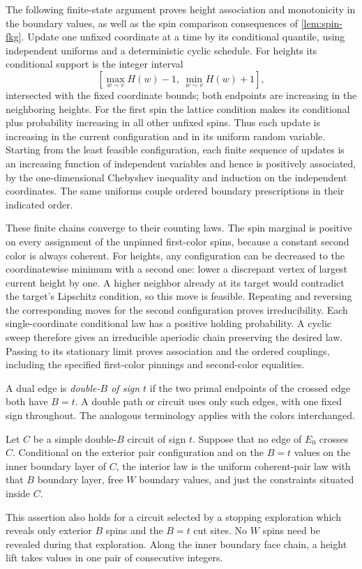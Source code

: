 The following finite-state argument proves height association and
monotonicity in the boundary values, as well as the spin comparison
consequences of \cref{lem:spin-fkg}.  Update one unfixed coordinate at a time by its
conditional quantile, using independent uniforms and a deterministic
cyclic schedule.  For heights its conditional support is the integer
interval
\[
 [\max_{w\sim v}H(w)-1,\ \min_{w\sim v}H(w)+1],
\]
intersected with the fixed coordinate bounds; both endpoints are
increasing in the neighboring heights.  For the first spin the lattice
condition makes its conditional plus probability increasing in all
other unfixed spins.  Thus each update is increasing in the current
configuration and in its uniform random variable.  Starting from the
least feasible configuration, each finite sequence of updates is an
increasing function of independent variables and hence is positively
associated, by the one-dimensional Chebyshev inequality and induction on
the independent coordinates.  The same uniforms couple ordered boundary prescriptions
in their indicated order.

These finite chains converge to their counting laws.  The spin marginal
is positive on every assignment of the unpinned first-color spins,
because a constant second color is always coherent.  For heights, any
configuration can be decreased to the coordinatewise minimum with a
second one: lower a discrepant vertex of largest current height by one.
A higher neighbor already at its target would contradict the target's
Lipschitz condition, so this move is feasible.  Repeating and reversing
the corresponding moves for the second configuration proves
irreducibility.  Each single-coordinate conditional law has a positive
holding probability.  A cyclic sweep therefore gives an irreducible
aperiodic chain preserving the desired law.  Passing to its stationary
limit proves association and the ordered couplings, including the
specified first-color pinnings and second-color equalities.

\begin{definition}
A dual edge is \emph{double-$B$ of sign $t$} if the two primal endpoints
of the crossed edge both have $B=t$.  A double path or circuit uses only
such edges, with one fixed sign throughout.  The analogous terminology
applies with the colors interchanged.
\end{definition}

\begin{lemma}\label{lem:double-cut}
Let $C$ be a simple double-$B$ circuit of sign $t$.  Suppose that no edge
of $E_0$ crosses $C$.  Conditional on the exterior pair configuration and
on the $B=t$ values on the inner boundary layer of $C$, the interior law
is the uniform coherent-pair law with that $B$ boundary layer, free $W$
boundary values, and just the constraints situated inside $C$.

This assertion also holds for a circuit selected by a stopping exploration
which reveals only exterior $B$ spins and the $B=t$ cut sites.  No $W$
spins need be revealed during that exploration.  Along the inner boundary
face chain, a height lift takes values in one pair of consecutive integers.
\end{lemma}

